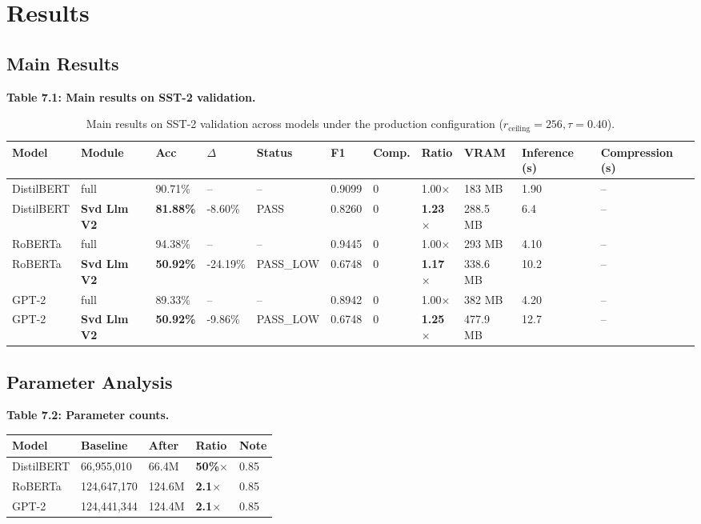 
\section{Results}

\subsection{Main Results}

\textbf{Table 7.1: Main results on SST-2 validation.}

\begin{table}[t]
\centering
\small
\begin{tabular}{lllllllllll}
\toprule
\textbf{Model} & \textbf{Module} & \textbf{Acc} & \textbf{$\Delta$} & \textbf{Status} & \textbf{F1} & \textbf{Comp.} & \textbf{Ratio} & \textbf{VRAM} & \textbf{Inference (s)} & \textbf{Compression (s)} \\
\midrule
DistilBERT & full & 90.71\% & -- & -- & 0.9099 & 0 & 1.00$\times$ & 183 MB & 1.90 & -- \\
DistilBERT & \textbf{Svd Llm V2} & \textbf{81.88\%} & -8.60\% & PASS & 0.8260 & 0 & \textbf{1.23$\times$} & 288.5 MB & 6.4 & -- \\
RoBERTa & full & 94.38\% & -- & -- & 0.9445 & 0 & 1.00$\times$ & 293 MB & 4.10 & -- \\
RoBERTa & \textbf{Svd Llm V2} & \textbf{50.92\%} & -24.19\% & PASS_LOW & 0.6748 & 0 & \textbf{1.17$\times$} & 338.6 MB & 10.2 & -- \\
GPT-2 & full & 89.33\% & -- & -- & 0.8942 & 0 & 1.00$\times$ & 382 MB & 4.20 & -- \\
GPT-2 & \textbf{Svd Llm V2} & \textbf{50.92\%} & -9.86\% & PASS_LOW & 0.6748 & 0 & \textbf{1.25$\times$} & 477.9 MB & 12.7 & -- \\
\bottomrule
\end{tabular}
\caption{Main results on SST-2 validation across models under the production configuration ($r_{\mathrm{ceiling}}=256, \tau=0.40$).}
\label{tab:main_sst2}
\end{table}

\subsection{Parameter Analysis}

\textbf{Table 7.2: Parameter counts.}

\begin{table}[H]
\centering
\small
\begin{tabular}{lllll}
\toprule
\textbf{Model} & \textbf{Baseline} & \textbf{After} & \textbf{Ratio} & \textbf{Note} \\
\midrule
DistilBERT & 66,955,010 & 66.4M & \textbf{50\%$\times$} & 0.85 \\
RoBERTa & 124,647,170 & 124.6M & \textbf{2.1$\times$} & 0.85 \\
GPT-2 & 124,441,344 & 124.4M & \textbf{2.1$\times$} & 0.85 \\
\bottomrule
\end{tabular}
\end{table}

